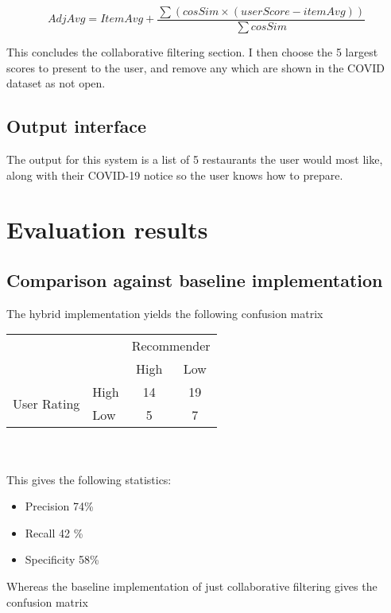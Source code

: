 \documentclass[conference]{IEEEtran}
\begin{document}
$$
    AdjAvg=ItemAvg+\dfrac{\sum (cosSim \times (userScore-itemAvg))}{\sum cosSim}
$$

This concludes the collaborative filtering section. I then choose the 5 largest scores to present to the user, and remove any which are shown in the COVID dataset as not open.

\subsection{Output interface}

The output for this system is a list of 5 restaurants the user would most like, along with their COVID-19 notice so the user knows how to prepare.

\section{Evaluation results}

\subsection{Comparison against baseline implementation}

The hybrid implementation yields the following confusion matrix

\begin{tabular}{l|l|c|c|}
    \multicolumn{2}{c}{}&\multicolumn{2}{c}{Recommender}\\
    \cline{3-4}
    \multicolumn{2}{c|}{}&High&Low\\
    \cline{2-4}
    \multirow{2}{*}{User Rating}& High & 14& 19\\
    \cline{2-4}
    & Low & 5 & 7\\
    \cline{2-4}

\end{tabular}
\\
\\
This gives the following statistics:
\begin{itemize}
    \item Precision 74\%
    \item Recall 42 \%
    \item Specificity 58\%
\end{itemize}
\vspace{2mm}
Whereas the baseline implementation of just collaborative filtering gives the confusion matrix
\end{document}
